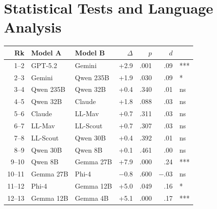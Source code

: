 \newpage
\section{Statistical Tests and Language Analysis}
\label{tab:pairwise-full}\label{tab:lang-gap}\label{tab:app-ablation-crosslingual}

\label{tab:app-ablation-prompt}\label{tab:app-ablation-cot}

\noindent
\begin{minipage}[t]{0.48\textwidth}
\scriptsize
\setlength{\tabcolsep}{2pt}
\label{tab:pairwise-detail}
\begin{tabular}{@{}rl@{\;vs.\;}l rrrl@{}}
\toprule
\textbf{Rk} & \textbf{Model A} & \textbf{Model B} & $\Delta$ & $p$ & $d$ & \\
\midrule
1--2  & GPT-5.2  & Gemini     & +2.9 & .001 & .09 & *** \\
2--3  & Gemini   & Qwen 235B  & +1.9 & .030 & .09 & * \\
3--4  & Qwen 235B& Qwen 32B   & +0.4 & .340 & .01 & ns \\
4--5  & Qwen 32B & Claude     & +1.8 & .088 & .03 & ns \\
5--6  & Claude   & LL-Mav     & +0.7 & .311 & .03 & ns \\
6--7  & LL-Mav   & LL-Scout   & +0.7 & .307 & .03 & ns \\
7--8  & LL-Scout & Qwen 30B   & +0.4 & .392 & .01 & ns \\
8--9  & Qwen 30B & Qwen 8B    & +0.1 & .461 & .00 & ns \\
9--10 & Qwen 8B  & Gemma 27B  & +7.9 & .000 & .24 & *** \\
10--11& Gemma 27B& Phi-4      & $-$0.8 & .600 & $-$.03 & ns \\
11--12& Phi-4    & Gemma 12B  & +5.0 & .049 & .16 & * \\
12--13& Gemma 12B& Gemma 4B   & +5.1 & .000 & .17 & *** \\
\bottomrule
\end{tabular}
\end{minipage}\hfill
